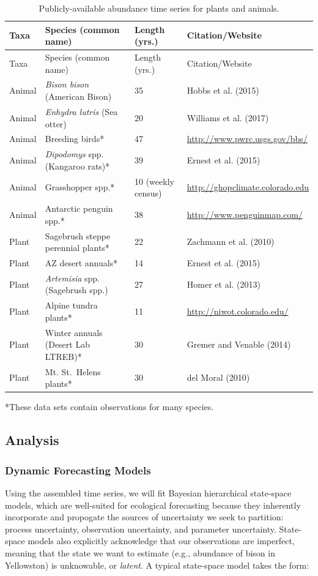 \documentclass[12pt,]{article}
\begin{document}
\footnotesize

\begin{longtable}[]{@{}llll@{}}
\caption{Publicly-available abundance time series for plants and
animals.}\tabularnewline
\toprule
Taxa & Species (common name) & Length (yrs.) &
Citation/Website\tabularnewline
\midrule
\endfirsthead
\toprule
Taxa & Species (common name) & Length (yrs.) &
Citation/Website\tabularnewline
\midrule
\endhead
Animal & \emph{Bison bison} (American Bison) & 35 & Hobbs et al.
(2015)\tabularnewline
Animal & \emph{Enhydra lutris} (Sea otter) & 20 & Williams et al.
(2017)\tabularnewline
Animal & Breeding birds* & 47 &
\url{http://www.pwrc.usgs.gov/bbs/}\tabularnewline
Animal & \emph{Dipodomys} spp. (Kangaroo rats)* & 39 & Ernest et al.
(2015)\tabularnewline
Animal & Grasshopper spp.* & 10 (weekly census) &
\url{http://ghopclimate.colorado.edu}\tabularnewline
Animal & Antarctic penguin spp.* & 38 &
\url{http://www.penguinmap.com/}\tabularnewline
Plant & Sagebrush steppe perennial plants* & 22 & Zachmann et al.
(2010)\tabularnewline
Plant & AZ desert annuals* & 14 & Ernest et al. (2015)\tabularnewline
Plant & \emph{Artemisia} spp. (Sagebrush spp.) & 27 & Homer et al.
(2013)\tabularnewline
Plant & Alpine tundra plants* & 11 &
\url{http://niwot.colorado.edu/}\tabularnewline
Plant & Winter annuals (Desert Lab LTREB)* & 30 & Gremer and Venable
(2014)\tabularnewline
Plant & Mt. St.~Helens plants* & 30 & del Moral (2010)\tabularnewline
\bottomrule
\end{longtable}

\vspace{-2em} *These data sets contain observations for many species.

\normalsize

\subsection{Analysis}\subsubsection{Dynamic Forecasting Models}

Using the assembled time series, we will fit Bayesian hierarchical
state-space models, which are well-suited for ecological forecasting
because they inherently incorporate and propogate the sources of
uncertainty we seek to partition: process uncertainty, observation
uncertainty, and parameter uncertainty. State-space models also
explicitly acknowledge that our observations are imperfect, meaning that
the state we want to estimate (e.g., abundance of bison in Yellowston)
is unknowable, or \emph{latent}. A typical state-space model takes the
form: \vspace{-1.5em}
\end{document}
